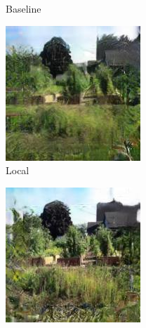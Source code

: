 \documentclass{article}
\begin{document}
\begin{figure}
\begin{subfigure}[b]{0.175\textwidth}
        \caption{Baseline}
    \end{subfigure}
    \hfill
    \begin{subfigure}[b]{0.175\textwidth}
        \includegraphics[width=\textwidth]{figs/fig2/local}
        \caption{Local}
    \end{subfigure}
    \hfill
    \begin{subfigure}[b]{0.175\textwidth}
        \includegraphics[width=\textwidth]{figs/fig2/residual}

\end{subfigure}
\end{figure}
\end{document}
